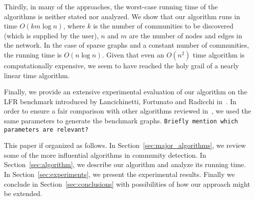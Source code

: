Thirdly, in many of the approaches, the worst-case running time of the algorithms 
is neither stated nor analyzed. We show that our algorithm runs in time $O(k m \log n)$, 
where $k$ is the number of communities to be discovered (which is supplied by the user), 
$n$ and $m$ are the number of nodes and edges in the network. In the case of sparse graphs 
and a constant number of communities, the running time is $O(n \log n)$. Given that even 
an $O(n^2)$ time algorithm is computationally expensive, we seem to have reached the holy grail 
of a nearly linear time algorithm.

Finally, we provide an extensive experimental evaluation of our algorithm on the LFR benchmark
introduced by Lancichinetti, Fortunato and Radicchi in~\cite{LFR08, LF09}. In order to ensure 
a fair comparison with other algorithms reviewed in~\cite{LF09}, we used the same parameters 
to generate the benchmark graphs. \texttt{Briefly mention which parameters are relevant?}


This paper if organized as follows. In Section~\ref{sec:major_algorithms}, we review some 
of the more influential algorithms in community detection. In Section~\ref{sec:algorithm}, we 
describe our algorithm and analyze its running time. In Section~\ref{sec:experiments}, we present 
the experimental results. Finally we conclude in Section~\ref{sec:conclusions} with possibilities
of how our approach might be extended. 



